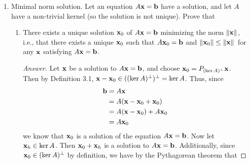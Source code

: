 \documentclass[../psets.tex]{subfiles}
\begin{document}
\begin{enumerate}[label={\textbf{4.\arabic*.}}]
\begin{enumerate}
\begin{proof}[Answer]
\begin{align*}
\begin{pmatrix}
                    31 & -9 & -16\\
                    -12 & 12 & 3\\
                    -11 & 0 & 11\\
                \end{pmatrix}
                \begin{pmatrix}
                    14\\
                    13\\
                    26\\
                \end{pmatrix}\\
                &= \frac{1}{50}
                \begin{pmatrix}
                    -6\\
                    73\\
                    101\\
                \end{pmatrix}
            \end{align*}
        \end{proof}
    \end{enumerate}
    \item Minimal norm solution. Let an equation $A\mathbf{x}=\mathbf{b}$ have a solution, and let $A$ have a non-trivial kernel (so the solution is not unique). Prove that
    \begin{enumerate}
        \item There exists a unique solution $\mathbf{x}_0$ of $A\mathbf{x}=\mathbf{b}$ minimizing the norm $\norm{\mathbf{x}}$, i.e., that there exists a unique $\mathbf{x}_0$ such that $A\mathbf{x}_0=\mathbf{b}$ and $\norm{\mathbf{x}_0}\leq\norm*{\mathbf{x}}$ for any $\mathbf{x}$ satisfying $A\mathbf{x}=\mathbf{b}$.
        \begin{proof}[Answer]
            Let $\mathbf{x}$ be a solution to $A\mathbf{x}=\mathbf{b}$, and choose $\mathbf{x}_0=P_{(\ker A)^\perp}\mathbf{x}$. Then by Definition 3.1, $\mathbf{x}-\mathbf{x}_0\in((\ker A)^\perp)^\perp=\ker A$. Thus, since
            \begin{align*}
                \mathbf{b} &= A\mathbf{x}\\
                &= A(\mathbf{x}-\mathbf{x}_0+\mathbf{x}_0)\\
                &= A(\mathbf{x}-\mathbf{x}_0)+A\mathbf{x}_0\\
                &= A\mathbf{x}_0
            \end{align*}
            we know that $\mathbf{x}_0$ is a solution of the equation $A\mathbf{x}=\mathbf{b}$. Now let $\mathbf{x}_h\in\ker A$. Then $\mathbf{x}_0+\mathbf{x}_h$ is a solution to $A\mathbf{x}=\mathbf{b}$. Additionally, since $\mathbf{x}_0\in(\ker A)^\perp$ by definition, we have by the Pythagorean theorem that

\end{proof}
\end{enumerate}
\end{enumerate}
\end{document}
